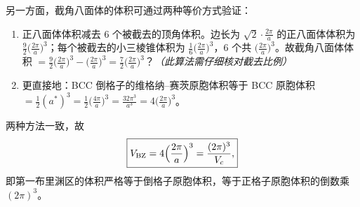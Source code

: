 \begin{derivationbox}[标准解题过程]
另一方面，截角八面体的体积可通过两种等价方式验证：
\begin{enumerate}
    \item 正八面体体积减去 6 个被截去的顶角体积。边长为 $\sqrt{2}\cdot\frac{2\pi}{a}$ 的正八面体体积为 $\frac{9}{2}\bigl(\frac{2\pi}{a}\bigr)^3$；每个被截去的小三棱锥体积为 $\frac{1}{6}\bigl(\frac{2\pi}{a}\bigr)^3$，6 个共 $\bigl(\frac{2\pi}{a}\bigr)^3$。故截角八面体体积 $=\frac{9}{2}\bigl(\frac{2\pi}{a}\bigr)^3 - \bigl(\frac{2\pi}{a}\bigr)^3 = \frac{7}{2}\bigl(\frac{2\pi}{a}\bigr)^3$？\textit{（此算法需仔细核对截去比例）}
    \item 更直接地：BCC 倒格子的维格纳--赛茨原胞体积等于 BCC 原胞体积 $=\frac{1}{2}(a^*)^3 = \frac{1}{2}\bigl(\frac{4\pi}{a}\bigr)^3 = \frac{32\pi^3}{a^3} = 4\bigl(\frac{2\pi}{a}\bigr)^3$。
\end{enumerate}

两种方法一致，故
\begin{equation}
\boxed{V_{\text{BZ}} = 4\Bigl(\frac{2\pi}{a}\Bigr)^3 = \frac{(2\pi)^3}{V_c},}
\end{equation}
即第一布里渊区的体积严格等于倒格子原胞体积，等于正格子原胞体积的倒数乘 $(2\pi)^3$。
\end{derivationbox}

